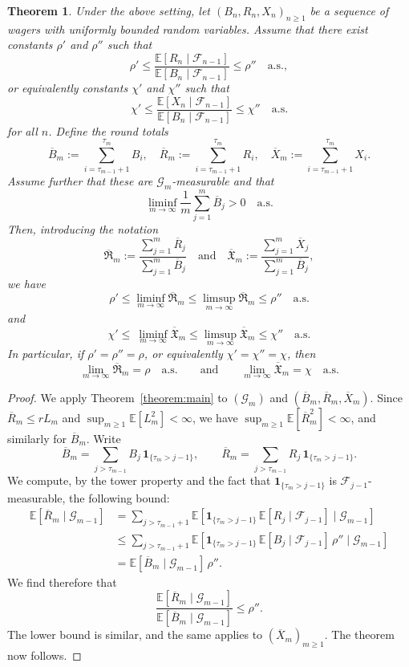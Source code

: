 \documentclass{article}
\newtheorem{theorem}{Theorem}[section]
\theoremstyle{definition}
\theoremstyle{remark}
\newcommand{\E}{\mathbb{E}}
\newcommand{\F}{\mathscr{F}}
\newcommand{\G}{\mathscr{G}}
\begin{document}
\begin{theorem}\label{thm:round}
Under the above setting, let $(B_n,R_n,X_n)_{n\ge1}$ be a sequence of wagers with uniformly bounded random variables.  
Assume that there exist constants $\rho'$ and $\rho''$ such that
\[
\rho' \le \frac{\E[R_n\mid\F_{n-1}]}{\E[B_n\mid\F_{n-1}]} \le \rho'' \quad \text{a.s.},
\]
or equivalently constants $\chi'$ and $\chi''$ such that
\[
\chi' \le \frac{\E[X_n\mid\F_{n-1}]}{\E[B_n\mid\F_{n-1}]} \le \chi'' \quad \text{a.s.}
\]
for all $n$.
Define the round totals
\[
\overline{B}_m:=\sum_{i=\tau_{m-1}+1}^{\tau_m} B_i,\quad
\overline{R}_m:=\sum_{i=\tau_{m-1}+1}^{\tau_m} R_i,\quad
\overline{X}_m:=\sum_{i=\tau_{m-1}+1}^{\tau_m} X_i.
\]
Assume further that these are $\G_m$-measurable and that
\[
\liminf_{m\to\infty} \frac{1}{m}\sum_{j=1}^m \overline{B}_j > 0 \quad \text{a.s.}
\]
Then, introducing the notation
\[
\overline{\mathfrak{R}}_m:=\frac{\sum_{j=1}^m \overline{R}_j}{\sum_{j=1}^m \overline{B}_j}\quad\text{and}\quad
\overline{\mathfrak{X}}_m:=\frac{\sum_{j=1}^m \overline{X}_j}{\sum_{j=1}^m \overline{B}_j},
\]
we have
\[
\rho' \le \liminf_{m\to\infty} \overline{\mathfrak{R}}_m
\le \limsup_{m\to\infty} \overline{\mathfrak{R}}_m
\le \rho''\quad \text{a.s.}
\]
and 
\[
\chi'  \le\ \liminf_{m\to\infty} \overline{\mathfrak{X}}_m
\le \limsup_{m\to\infty} \overline{\mathfrak{X}}_m
\le \chi''\quad \text{a.s.}
\]
In particular, if $\rho'=\rho''=\rho$, or equivalently $\chi'=\chi''=\chi$, then
\[
\lim_{m\to\infty}\overline{\mathfrak{R}}_m = \rho \quad \text{a.s.} \qquad \text{and}
\qquad
\lim_{m\to\infty} \overline{\mathfrak{X}}_m = \chi
\quad \text{a.s.}
\]
\end{theorem}

\begin{proof}
We apply Theorem~\ref{theorem:main} to $(\G_m)$ and $(\overline{B}_m,\overline{R}_m,\overline{X}_m)$.  
Since $\overline{R}_m\le rL_m$ and $\sup_{m\ge1}\E[L_m^2]<\infty$, we have $\sup_{m\ge1}\E[\overline{R}_m^2]<\infty$, and similarly for $\overline{B}_m$.  
Write
\[
\overline{B}_m=\sum_{j>\tau_{m-1}} B_j\,\mathbf 1_{\{\tau_m>j-1\}}, \qquad \overline{R}_m=\sum_{j>\tau_{m-1}} R_j\,\mathbf 1_{\{\tau_m>j-1\}}.
\]
We compute, by the tower property and the fact that $\mathbf 1_{\{\tau_m>j-1\}}$ is $\F_{j-1}$-measurable, the following bound:
\begin{align*}
    \E[\overline{R}_m\mid \G_{m-1}]
    &=\sum_{j > \tau_{m-1}+1}\E[\mathbf 1_{\{\tau_m>j-1\}}\,\E[R_j\mid\F_{j-1}]\mid \G_{m-1}]\\
    &\le \sum_{j > \tau_{m-1}+1}\E[\mathbf 1_{\{\tau_m>j-1\}}\,\E[B_j\mid\F_{j-1}]\, \rho''\mid \G_{m-1}]\\
    &=\E[\overline{B}_m\mid \G_{m-1}]\, \rho''.
\end{align*}
We find therefore that
\[
\frac{\E[\overline{R}_m\mid\G_{m-1}]}{\E[\overline{B}_m\mid\G_{m-1}]} \le \rho''.
\]
The lower bound is similar, and the same applies to $(\overline{X}_m)_{m\ge 1}$.  
The theorem now follows.
\end{proof}
\end{document}
